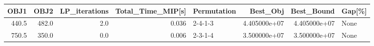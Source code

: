 \begin{tabular}{rrrrlrrl}
\toprule
  OBJ1 &   OBJ2 &  LP\_iterations &  Total\_Time\_MIP[s] & Permutation &      Best\_Obj &    Best\_Bound & Gap[\%] \\
\midrule
 440.5 &  482.0 &            2.0 &              0.036 &     2-4-1-3 &  4.405000e+07 &  4.405000e+07 &   None \\
 750.5 &  350.0 &            0.0 &              0.006 &     2-3-1-4 &  3.500000e+07 &  3.500000e+07 &   None \\
\bottomrule
\end{tabular}

